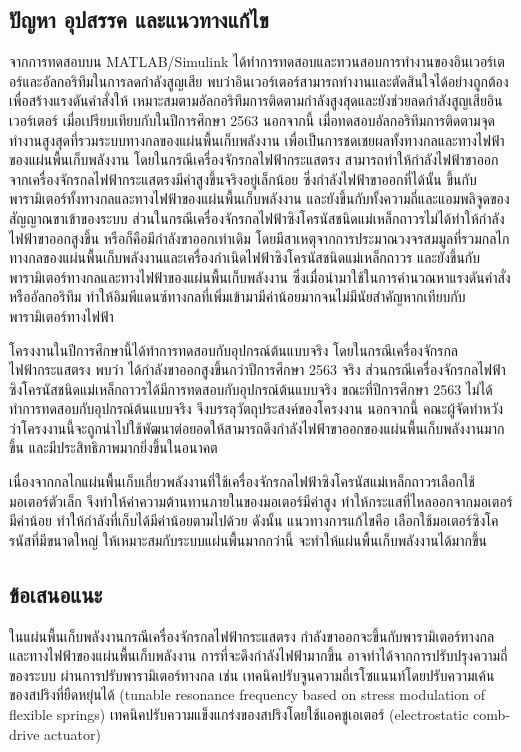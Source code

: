 \documentclass[11pt,a4paper]{article}
\begin{document}
\subsection{ปัญหา อุปสรรค และแนวทางแก้ไข}
จากการทดสอบบน MATLAB/Simulink ได้ทำการทดสอบและทวนสอบการทำงานของอินเวอร์เตอร์และอัลกอริทึมในการลดกำลังสูญเสีย พบว่าอินเวอร์เตอร์สามารถทำงานและตัดสินใจได้อย่างถูกต้อง เพื่อสร้างแรงดันคำสั่งให้ เหมาะสมตามอัลกอริทึมการติดตามกำลังสูงสุดและยังช่วยลดกำลังสูญเสียอินเวอร์เตอร์ เมื่อเปรียบเทียบกับในปีการศึกษา 2563 นอกจากนี้ เมื่อทดสอบอัลกอริทึมการติดตามจุดทำงานสูงสุดที่รวมระบบทางกลของแผ่นพื้นเก็บพลังงาน เพื่อเป็นการชดเชยผลทั้งทางกลและทางไฟฟ้าของแผ่นพื้นเก็บพลังงาน โดยในกรณีเครื่องจักรกลไฟฟ้ากระแสตรง สามารถทำให้กำลังไฟฟ้าขาออกจากเครื่องจักรกลไฟฟ้ากระแสตรงมีค่าสูงขึ้นจริงอยู่เล็กน้อย ซึ่งกำลังไฟฟ้าขาออกที่ได้นั้น ขึ้นกับพารามิเตอร์ทั้งทางกลและทางไฟฟ้าของแผ่นพื้นเก็บพลังงาน และยังขึ้นกับทั้งความถี่และแอมพลิจูดของสัญญาณขาเข้าของระบบ ส่วนในกรณีเครื่องจักรกลไฟฟ้าซิงโครนัสชนิดแม่เหล็กถาวรไม่ได้ทำให้กำลังไฟฟ้าขาออกสูงขึ้น หรือก็คือมีกำลังขาออกเท่าเดิม โดยมีสาเหตุจากการประมาณวงจรสมมูลที่รวมกลไกทางกลของแผ่นพื้นเก็บพลังงานและเครื่องกำเนิดไฟฟ้าซิงโครนัสชนิดแม่เหล็กถาวร และยังขึ้นกับพารามิเตอร์ทางกลและทางไฟฟ้าของแผ่นพื้นเก็บพลังงาน ซึ่งเมื่อนำมาใช้ในการคำนวณหาแรงดันคำสั่งหรืออัลกอริทึม ทำให้อิมพีแดนซ์ทางกลที่เพิ่มเข้ามามีค่าน้อยมากจนไม่มีนัยสำคัญหากเทียบกับพารามิเตอร์ทางไฟฟ้า

โครงงานในปีการศึกษานี้ได้ทำการทดสอบกับอุปกรณ์ต้นแบบจริง โดยในกรณีเครื่องจักรกลไฟฟ้ากระแสตรง พบว่า ได้กำลังขาออกสูงขึ้นกว่าปีการศึกษา 2563 จริง ส่วนกรณีเครื่องจักรกลไฟฟ้าซิงโครนัสชนิดแม่เหล็กถาวรได้มีการทดสอบกับอุปกรณ์ต้นแบบจริง ขณะที่ปีการศึกษา 2563 ไม่ได้ทำการทดสอบกับอุปกรณ์ต้นแบบจริง จึงบรรลุวัตถุประสงค์ของโครงงาน นอกจากนี้ คณะผู้จัดทำหวังว่าโครงงานนี้จะถูกนำไปใช้พัฒนาต่อยอดให้สามารถดึงกำลังไฟฟ้าขาออกของแผ่นพื้นเก็บพลังงานมากขึ้น และมีประสิทธิภาพมากยิ่งขึ้นในอนาคต

เนื่องจากกลไกแผ่นพื้นเก็บเกี่ยวพลังงานที่ใช้เครื่องจักรกลไฟฟ้าซิงโครนัสแม่เหล็กถาวรเลือกใช้มอเตอร์ตัวเล็ก จึงทำให้ค่าความต้านทานภายในของมอเตอร์มีค่าสูง ทำให้กระแสที่ไหลออกจากมอเตอร์มีค่าน้อย ทำให้กำลังที่เก็บได้มีค่าน้อยตามไปด้วย ดังนั้น แนวทางการแก้ไขคือ เลือกใช้มอเตอร์ซิงโครนัสที่มีขนาดใหญ่ ให้เหมาะสมกับระบบแผ่นพื้นมากกว่านี้ จะทำให้แผ่นพื้นเก็บพลังงานได้มากขึ้น

\subsection{ข้อเสนอแนะ}
ในแผ่นพื้นเก็บพลังงานกรณีเครื่องจักรกลไฟฟ้ากระแสตรง กำลังขาออกจะขึ้นกับพารามิเตอร์ทางกลและทางไฟฟ้าของแผ่นพื้นเก็บพลังงาน การที่จะดึงกำลังไฟฟ้ามากขึ้น อาจทำได้จากการปรับปรุงความถี่ของระบบ ผ่านการปรับพารามิเตอร์ทางกล เช่น เทคนิคปรับจูนความถี่เรโซแนนท์โดยปรับความเค้นของสปริงที่ยืดหยุ่นได้ (tunable resonance frequency based on stress modulation of flexible springs) เทคนิคปรับความแข็งแกร่งของสปริงโดยใช้แอคชูเอเตอร์ (electrostatic comb-drive actuator)
\end{document}
